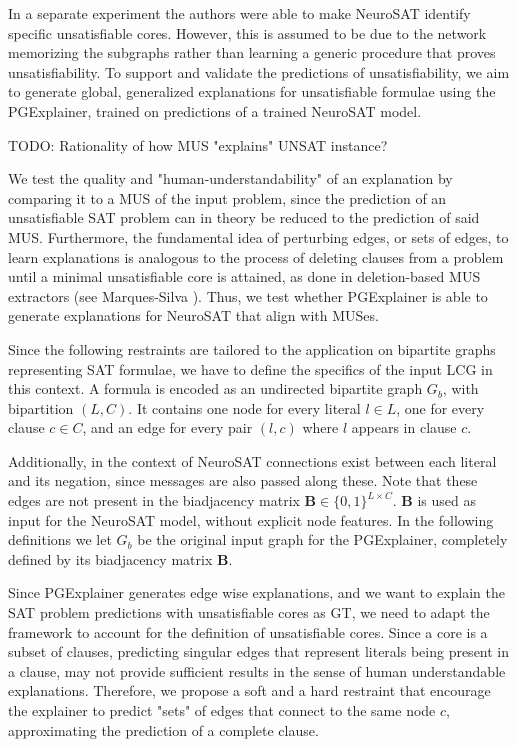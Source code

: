 In a separate experiment the authors were able to make NeuroSAT identify specific unsatisfiable cores. However, this is assumed to be due to the network memorizing the subgraphs rather than learning a generic procedure that proves unsatisfiability. To support and validate the predictions of unsatisfiability, we aim to generate global, generalized explanations for unsatisfiable formulae using the PGExplainer, trained on predictions of a trained NeuroSAT model. 

TODO: Rationality of how MUS "explains" UNSAT instance?


We test the quality and "human-understandability" of an explanation by comparing it to a MUS of the input problem, since the prediction of an unsatisfiable SAT problem can in theory be reduced to the prediction of said MUS. Furthermore, the fundamental idea of perturbing edges, or sets of edges, to learn explanations is analogous to the process of deleting clauses from a problem until a minimal unsatisfiable core is attained, as done in deletion-based MUS extractors (see Marques-Silva \cite{5489199}). Thus, we test whether PGExplainer is able to generate explanations for NeuroSAT that align with MUSes. \bigskip

Since the following restraints are tailored to the application on bipartite graphs representing SAT formulae, we have to define the specifics of the input LCG in this context. A formula is encoded as an undirected bipartite graph $G_b$, with bipartition $(L,C)$. It contains one node for every literal $l \in L$, one for every clause $c \in C$, and an edge for every pair $(l,c)$ where $l$ appears in clause $c$. 

Additionally, in the context of NeuroSAT connections exist between each literal and its negation, since messages are also passed along these. Note that these edges are not present in the biadjacency matrix $\mathbf{B}\in \{0,1\}^{L\times C}$. $\mathbf{B}$ is used as input for the NeuroSAT model, without explicit node features. In the following definitions we let $G_b$ be the original input graph for the PGExplainer, completely defined by its biadjacency matrix $\mathbf{B}$. \bigskip


Since PGExplainer generates edge wise explanations, and we want to explain the SAT problem predictions with unsatisfiable cores as \ac{GT}, we need to adapt the framework to account for the definition of unsatisfiable cores. Since a core is a subset of clauses, predicting singular edges that represent literals being present in a clause, may not provide sufficient results in the sense of human understandable explanations. Therefore, we propose a soft and a hard restraint that encourage the explainer to predict "sets" of edges that connect to the same node $c$, approximating the prediction of a complete clause.

